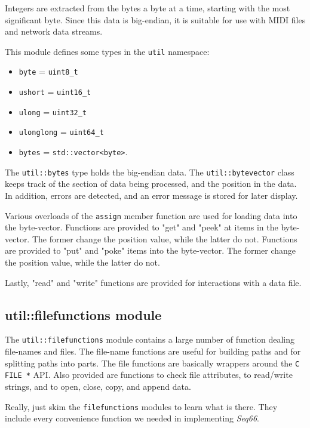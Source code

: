   Integers are extracted from the bytes a byte at a time, starting with
   the most significant byte.
   Since this data is big-endian, it is suitable for use with MIDI
   files and network data streams.

   This module defines some types in the \texttt{util} namespace:

   \begin{itemize}
      \item \texttt{byte} = \texttt{uint8\_t}
      \item \texttt{ushort} = \texttt{uint16\_t}
      \item \texttt{ulong} = \texttt{uint32\_t}
      \item \texttt{ulonglong} = \texttt{uint64\_t}
      \item \texttt{bytes} = \texttt{std::vector<byte>}.
   \end{itemize}

   The \texttt{util::bytes} type holds the big-endian data.
   The \texttt{util::bytevector} class keeps track of the
   section of data being processed, and the position in the data.
   In addition, errors are detected, and an error message is stored
   for later display.

   Various overloads of the \texttt{assign} member function are used
   for loading data into the byte-vector.
   Functions are provided to "get" and "peek" at items in the byte-vector.
   The former change the position value, while the latter do not.
   Functions are provided to "put" and "poke" items into the byte-vector.
   The former change the position value, while the latter do not.

   Lastly, "read" and "write" functions are provided for interactions
   with a data file.

\subsection{util::filefunctions module}
\label{subsec:util_namespace_filefunctions}

   The \texttt{util::filefunctions} module contains a large number of
   function dealing file-names and files.
   The file-name functions are useful for building paths and for splitting
   paths into parts.
   The file functions are basically wrappers around the \texttt{C FILE *}
   API.
   Also provided are functions to check file attributes, to read/write
   strings, and to open, close, copy, and append data.

   Really, just skim the \texttt{filefunctions} modules to learn what is
   there.  They include every convenience function we needed in implementing
   \textsl{Seq66}.

